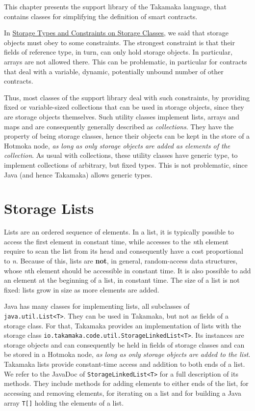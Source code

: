 \documentclass[a4paper,]{book}
\begin{document}
{This chapter presents the support library of the Takamaka language, that
contains classes for simplifying the definition of smart contracts.

In \protect\hyperlink{storage-types}{Storage Types and Constraints on
Storage Classes}, we said that storage objects must obey to some
constraints. The strongest constraint is that their fields of reference
type, in turn, can only hold storage objects. In particular, arrays are
not allowed there. This can be problematic, in particular for contracts
that deal with a variable, dynamic, potentially unbound number of other
contracts.

Thus, most classes of the support library deal with such constraints, by
providing fixed or variable-sized collections that can be used in
storage objects, since they are storage objects themselves. Such utility
classes implement lists, arrays and maps and are consequently generally
described as \emph{collections}. They have the property of being storage
classes, hence their objects can be kept in the store of a Hotmoka node,
\emph{as long as only storage objects are added as elements of the
collection}. As usual with collections, these utility classes have
generic type, to implement collections of arbitrary, but fixed types.
This is not problematic, since Java (and hence Takamaka) allows generic
types.

\hypertarget{storage-lists}{%
\section{Storage Lists }\label{storage-lists}}

Lists are an ordered sequence of elements. In a list, it is typically
possible to access the first element in constant time, while accesses to
the \emph{n}th element require to scan the list from its head and
consequently have a cost proportional to \emph{n}. Because of this,
lists are \textbf{not}, in general, random-access data structures, whose
\emph{n}th element should be accessible in constant time. It is also
possible to add an element at the beginning of a list, in constant time.
The size of a list is not fixed: lists grow in size as more elements are
added.

Java has many classes for implementing lists, all subclasses of
\texttt{java.util.List\textless{}T\textgreater{}}. They can be used in
Takamaka, but not as fields of a storage class. For that, Takamaka
provides an implementation of lists with the storage class
\texttt{io.takamaka.code.util.StorageLinkedList\textless{}T\textgreater{}}.
Its instances are storage objects and can consequently be held in fields
of storage classes and can be stored in a Hotmoka node, \emph{as long as
only storage objects are added to the list}. Takamaka lists provide
constant-time access and addition to both ends of a list. We refer to
the JavaDoc of \texttt{StorageLinkedList\textless{}T\textgreater{}} for
a full description of its methods. They include methods for adding
elements to either ends of the list, for accessing and removing
elements, for iterating on a list and for building a Java array
\texttt{T{[}{]}} holding the elements of a list.

}
\end{document}
